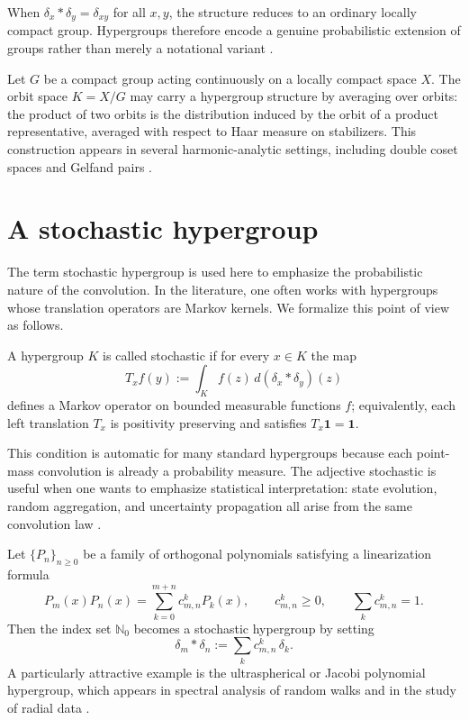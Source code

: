 \documentclass[twoside]{article}
\begin{document}
 \begin{rem} 
 When $\delta_x * \delta_y = \delta_{xy}$ for all $x,y$, the structure reduces to an ordinary locally compact group. Hypergroups therefore encode a genuine probabilistic extension of groups rather than merely a notational variant \cite{BloomHeyer:1995}. 
 \end{rem}
 
  \begin{eg} 
  Let $G$ be a compact group acting continuously on a locally compact space $X$. The orbit space $K=X/G$ may carry a hypergroup structure by averaging over orbits: the product of two orbits is the distribution induced by the orbit of a product representative, averaged with respect to Haar measure on stabilizers. This construction appears in several harmonic-analytic settings, including double coset spaces and Gelfand pairs \cite{Jewett:1975,Voit:2014}. 
  \end{eg} 
  
  \section{A stochastic hypergroup} 
  
  The term stochastic hypergroup is used here to emphasize the probabilistic nature of the convolution. In the literature, one often works with hypergroups whose translation operators are Markov kernels. We formalize this point of view as follows. 
  
 \begin{dfn} A hypergroup $K$ is called stochastic if for every $x\in K$ the map \[ T_x f(y):=\int_K f(z)\, d(\delta_x * \delta_y)(z) \] defines a Markov operator on bounded measurable functions $f$; equivalently, each left translation $T_x$ is positivity preserving and satisfies $T_x \mathbf{1}=\mathbf{1}$. 
 \end{dfn} 
  
 \begin{rem} 
  This condition is automatic for many standard hypergroups because each point-mass convolution is already a probability measure. The adjective stochastic is useful when one wants to emphasize statistical interpretation: state evolution, random aggregation, and uncertainty propagation all arise from the same convolution law \cite{Ross:2012,Voit:2014}. 
\end{rem} 
  
\begin{eg} 
Let $\{P_n\}_{n\ge 0}$ be a family of orthogonal polynomials satisfying a linearization formula \[ P_m(x)P_n(x)=\sum_{k=0}^{m+n} c_{m,n}^k P_k(x), \qquad c_{m,n}^k\ge 0,\qquad \sum_k c_{m,n}^k=1. \] Then the index set $\mathbb{N}_0$ becomes a stochastic hypergroup by setting \[ \delta_m * \delta_n := \sum_k c_{m,n}^k\,\delta_k. \] A particularly attractive example is the ultraspherical or Jacobi polynomial hypergroup, which appears in spectral analysis of random walks and in the study of radial data \cite{BloomHeyer:1995,Voit:2014}. 
\end{eg} 
\end{document}
